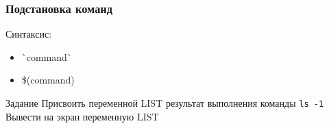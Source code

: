 \begin{frame}
	\frametitle{Подстановка команд}
	
	Синтаксис:

	\begin{itemize}
		\item \`{}command\`{}
		\item \$(command)
	\end{itemize}
	\pause
	\begin{block}{Задание}
Присвоить переменной LIST результат выполнения команды {\tt ls -1} \\
Вывести на экран переменную LIST
	\end{block}
\end{frame}
